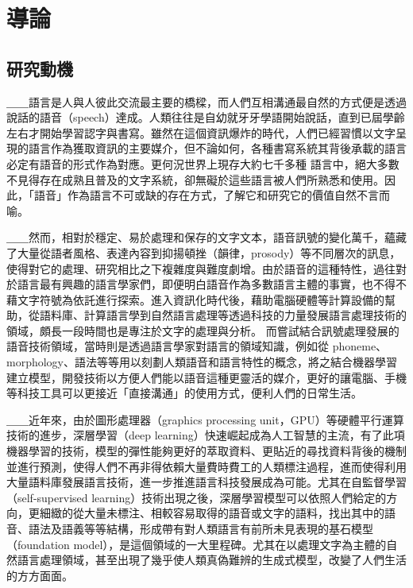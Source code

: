 \chapter{導論}
\section{研究動機}

＿＿語言是人與人彼此交流最主要的橋樑，而人們互相溝通最自然的方式便是透過說話的語音（speech）達成。人類往往是自幼就牙牙學語開始說話，直到已屆學齡左右才開始學習認字與書寫。雖然在這個資訊爆炸的時代，人們已經習慣以文字呈現的語言作為獲取資訊的主要媒介，但不論如何，各種書寫系統其背後承載的語言必定有語音的形式作為對應。更何況世界上現存大約七千多種  \cite{ethnologue}  語言中，絕大多數不見得存在成熟且普及的文字系統，卻無礙於這些語言被人們所熟悉和使用。因此，「語音」作為語言不可或缺的存在方式，了解它和研究它的價值自然不言而喻。

＿＿然而，相對於穩定、易於處理和保存的文字文本，語音訊號的變化萬千，蘊藏了大量從語者風格、表達內容到抑揚頓挫（韻律，prosody）等不同層次的訊息，使得對它的處理、研究相比之下複雜度與難度劇增。由於語音的這種特性，過往對於語言最有興趣的語言學家們，即便明白語音作為多數語言主體的事實，也不得不藉文字符號為依託進行探索。進入資訊化時代後，藉助電腦硬體等計算設備的幫助，從語料庫、計算語言學到自然語言處理等透過科技的力量發展語言處理技術的領域，頗長一段時間也是專注於文字的處理與分析。
而嘗試結合訊號處理發展的語音技術領域，當時則是透過語言學家對語言的領域知識，例如從 phoneme、morphology、語法等等用以刻劃人類語音和語言特性的概念，將之結合機器學習建立模型，開發技術以方便人們能以語音這種更靈活的媒介，更好的讓電腦、手機等科技工具可以更接近「直接溝通」的使用方式，便利人們的日常生活。

＿＿近年來，由於圖形處理器（graphics processing unit，GPU）等硬體平行運算技術的進步，深層學習（deep learning）快速崛起成為人工智慧的主流，有了此項機器學習的技術，模型的彈性能夠更好的萃取資料、更貼近的尋找資料背後的機制並進行預測，使得人們不再非得依賴大量費時費工的人類標注過程，進而使得利用大量語料庫發展語言技術，進一步推進語言科技發展成為可能。尤其在自監督學習（self-supervised learning）技術出現之後，深層學習模型可以依照人們給定的方向，更細緻的從大量未標注、相較容易取得的語音或文字的語料，找出其中的語音、語法及語義等等結構，形成帶有對人類語言有前所未見表現的基石模型（foundation model），是這個領域的一大里程碑。尤其在以處理文字為主體的自然語言處理領域，甚至出現了幾乎使人類真偽難辨的生成式模型，改變了人們生活的方方面面。


